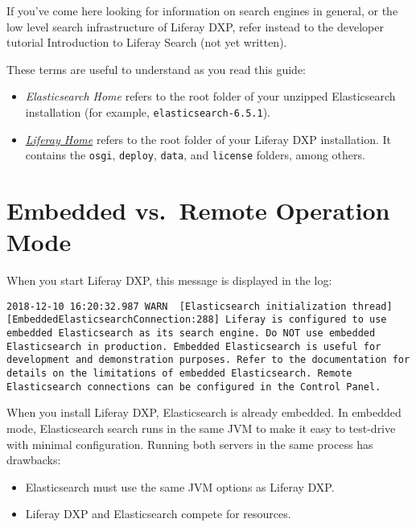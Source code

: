If you've come here looking for information on search engines in
general, or the low level search infrastructure of Liferay DXP, refer
instead to the developer tutorial Introduction to Liferay Search (not
yet written).

These terms are useful to understand as you read this guide:

\begin{itemize}
\item
  \emph{Elasticsearch Home} refers to the root folder of your unzipped
  Elasticsearch installation (for example,
  \texttt{elasticsearch-6.5.1}).
\item
  \href{/docs/7-1/deploy/-/knowledge_base/d/installing-liferay\#liferay-home}{\emph{Liferay
  Home}} refers to the root folder of your Liferay DXP installation. It
  contains the \texttt{osgi}, \texttt{deploy}, \texttt{data}, and
  \texttt{license} folders, among others.
\end{itemize}

\section{Embedded vs.~Remote Operation
Mode}\label{embedded-vs.-remote-operation-mode}

When you start Liferay DXP, this message is displayed in the log:

\begin{verbatim}
2018-12-10 16:20:32.987 WARN  [Elasticsearch initialization thread][EmbeddedElasticsearchConnection:288] Liferay is configured to use embedded Elasticsearch as its search engine. Do NOT use embedded Elasticsearch in production. Embedded Elasticsearch is useful for development and demonstration purposes. Refer to the documentation for details on the limitations of embedded Elasticsearch. Remote Elasticsearch connections can be configured in the Control Panel.
\end{verbatim}

When you install Liferay DXP, Elasticsearch is already embedded. In
embedded mode, Elasticsearch search runs in the same JVM to make it easy
to test-drive with minimal configuration. Running both servers in the
same process has drawbacks:

\begin{itemize}
\tightlist
\item
  Elasticsearch must use the same JVM options as Liferay DXP.
\item
  Liferay DXP and Elasticsearch compete for resources.
\end{itemize}

